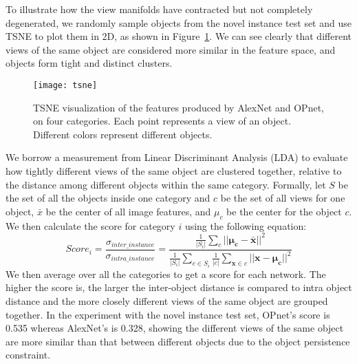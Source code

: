 \documentclass{article} %
\begin{document}
To illustrate how the view manifolds have contracted but not completely degenerated, we randomly sample objects from the novel instance test set and use TSNE \citep{maaten2008visualizing} to plot them in 2D, as shown in Figure~\ref{fig:tsne}. We can see clearly that different views of the same object are considered more similar in the feature space, and objects form tight and distinct clusters. 
\begin{figure}[htbp]
\centering
\texttt{[image: tsne]}
\caption{TSNE visualization of the features produced by AlexNet and OPnet, on four categories. Each point represents a view of an object. Different colors represent different objects.}
\label{fig:tsne}
\end{figure}
We borrow a measurement from Linear Discriminant Analysis (LDA) to evaluate how tightly different views of the same object are clustered together, relative to the distance among different objects within the same category. Formally, let $S$ be the set of all the objects inside one category and $c$ be the set of all views for one object, $\bar{x}$ be the center of all image features, and $\mu_{c}$ be the center for the object $c$. We then calculate the score for category $i$ using the following equation:
\small
$$
Score_i=\frac{\sigma_{inter\_instance}}{\sigma_{intra\_instance}}=\frac{\frac{1}{|S_i|}\displaystyle\sum_{c}||\mathbf{\mu_{c}}-\mathbf{\bar{x}}||^{2}}{\frac{1}{|S_i|}\displaystyle\sum_{c \in S_i}\frac{1}{|c|}\displaystyle\sum_{\mathbf{x} \in c}||\mathbf{x}-\mathbf{\mu_{c}}||^{2}}
$$
\normalsize
We then average over all the categories to get a score for each network. The higher the score is, the larger the inter-object distance is compared to intra object distance and the more closely different views of the same object are grouped together. In the experiment with the novel instance test set, OPnet's score is 0.535 whereas AlexNet's is 0.328, showing the different views of the same object are more similar than that between different objects due to the object persistence constraint. 

\end{document}

